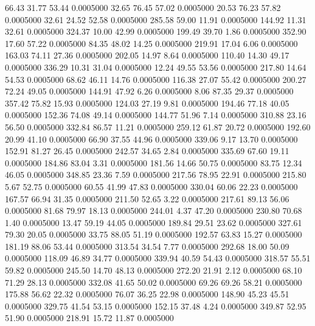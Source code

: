   66.43   31.77   53.44   0.0005000
  32.65   76.45   57.02   0.0005000
  20.53   76.23   57.82   0.0005000
  32.61   24.52   52.58   0.0005000
 285.58   59.00   11.91   0.0005000
 144.92   11.31   32.61   0.0005000
 324.37   10.00   42.99   0.0005000
 199.49   39.70    1.86   0.0005000
 352.90   17.60   57.22   0.0005000
  84.35   48.02   14.25   0.0005000
 219.91   17.04    6.06   0.0005000
 163.03   74.11   27.36   0.0005000
 202.05   14.97    8.64   0.0005000
 110.40   14.30   49.17   0.0005000
 336.29   10.31   31.04   0.0005000
  12.24   49.55   53.56   0.0005000
 217.80   14.64   54.53   0.0005000
  68.62   46.11   14.76   0.0005000
 116.38   27.07   55.42   0.0005000
 200.27   72.24   49.05   0.0005000
 144.91   47.92    6.26   0.0005000
   8.06   87.35   29.37   0.0005000
 357.42   75.82   15.93   0.0005000
 124.03   27.19    9.81   0.0005000
 194.46   77.18   40.05   0.0005000
 152.36   74.08   49.14   0.0005000
 144.77   51.96    7.14   0.0005000
 310.88   23.16   56.50   0.0005000
 332.84   86.57   11.21   0.0005000
 259.12   61.87   20.72   0.0005000
 192.60   20.99   41.10   0.0005000
  66.90   37.55   44.96   0.0005000
 339.06    9.17   13.70   0.0005000
 152.91   81.27   26.45   0.0005000
 242.57   34.65    2.84   0.0005000
 335.69   67.60   19.11   0.0005000
 184.86   83.04    3.31   0.0005000
 181.56   14.66   50.75   0.0005000
  83.75   12.34   46.05   0.0005000
 348.85   23.36    7.59   0.0005000
 217.56   78.95   22.91   0.0005000
 215.80    5.67   52.75   0.0005000
  60.55   41.99   47.83   0.0005000
 330.04   60.06   22.23   0.0005000
 167.57   66.94   31.35   0.0005000
 211.50   52.65    3.22   0.0005000
 217.61   89.13   56.06   0.0005000
  81.68   79.97   18.13   0.0005000
 244.01    4.37   47.20   0.0005000
 230.80   70.68    1.40   0.0005000
  13.47   59.19   44.05   0.0005000
 189.84   29.51   23.62   0.0005000
 327.61   79.30   20.05   0.0005000
  33.75   88.05   51.19   0.0005000
 192.57   63.83   15.27   0.0005000
 181.19   88.06   53.44   0.0005000
 313.54   34.54    7.77   0.0005000
 292.68   18.00   50.09   0.0005000
 118.09   46.89   34.77   0.0005000
 339.94   40.59   54.43   0.0005000
 318.57   55.51   59.82   0.0005000
 245.50   14.70   48.13   0.0005000
 272.20   21.91    2.12   0.0005000
  68.10   71.29   28.13   0.0005000
 332.08   41.65   50.02   0.0005000
  69.26   69.26   58.21   0.0005000
 175.88   56.62   22.32   0.0005000
  76.07   36.25   22.98   0.0005000
 148.90   45.23   45.51   0.0005000
 329.75   41.54   53.15   0.0005000
 152.15   37.48    4.24   0.0005000
 349.87   52.95   51.90   0.0005000
 218.91   15.72   11.87   0.0005000
